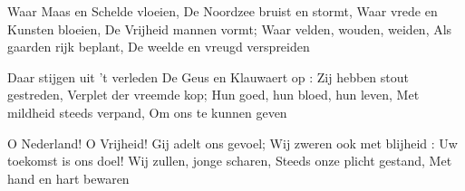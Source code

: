\footnotemark [
ititle={Waar Maas en Schelde vloeien}]


\beginverse
Waar Maas en Schelde vloeien,
De Noordzee bruist en stormt,
Waar vrede en Kunsten bloeien,
De Vrijheid mannen vormt;
Waar velden, wouden, weiden,
Als gaarden rijk beplant,
De weelde en vreugd verspreiden
\endverse

\beginverse
Daar stijgen uit 't verleden
De Geus en Klauwaert op :
Zij hebben stout gestreden,
Verplet der vreemde kop;
Hun goed, hun bloed, hun leven,
Met mildheid steeds verpand,
Om ons te kunnen geven
\endverse

\beginverse
O Nederland! O Vrijheid!
Gij adelt ons gevoel;
Wij zweren ook met blijheid :
Uw toekomst is ons doel!
Wij zullen, jonge scharen,
Steeds onze plicht gestand,
Met hand en hart bewaren
\endverse
\endsong